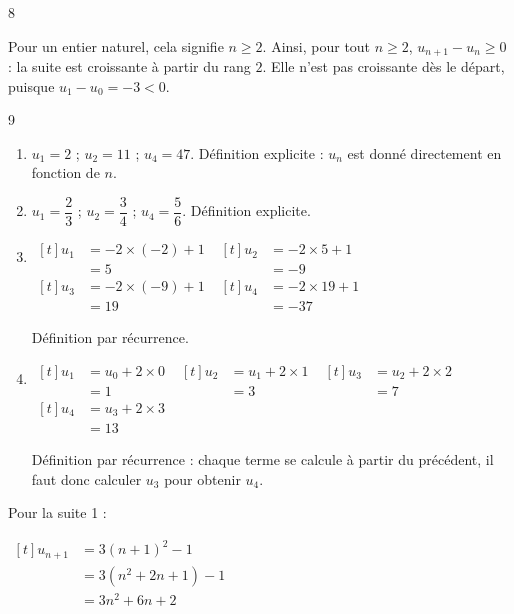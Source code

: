 \documentclass[10pt,a4paper]{article}
\begin{document}
\begin{corr}[Guidé]{8}
\begin{enumerate}[leftmargin=*]
    Pour un entier naturel, cela signifie \(n\geq 2\). Ainsi, pour tout \(n\geq 2\), \(u_{n+1}-u_n\geq 0\) : la suite est croissante à partir du rang \(2\). Elle n'est pas croissante dès le départ, puisque \(u_1-u_0=-3<0\).
\end{enumerate}
\end{corr}

\begin{corr}{9}
\begin{enumerate}[leftmargin=*]
    \item \(u_1=2\) ; \(u_2=11\) ; \(u_4=47\). Définition explicite : \(u_n\) est donné directement en fonction de \(n\).
    \item \(u_1=\dfrac{2}{3}\) ; \(u_2=\dfrac{3}{4}\) ; \(u_4=\dfrac{5}{6}\). Définition explicite.
    \item \(\begin{aligned}[t] u_1&=-2\times(-2)+1\\ &=5\end{aligned}\) \qquad \(\begin{aligned}[t] u_2&=-2\times 5+1\\ &=-9\end{aligned}\) \qquad \(\begin{aligned}[t] u_3&=-2\times(-9)+1\\ &=19\end{aligned}\) \qquad \(\begin{aligned}[t] u_4&=-2\times 19+1\\ &=-37\end{aligned}\)

    Définition par récurrence.
    \item[\(\star\)~4.] \(\begin{aligned}[t] u_1&=u_0+2\times 0\\ &=1\end{aligned}\) \qquad \(\begin{aligned}[t] u_2&=u_1+2\times 1\\ &=3\end{aligned}\) \qquad \(\begin{aligned}[t] u_3&=u_2+2\times 2\\ &=7\end{aligned}\) \qquad \(\begin{aligned}[t] u_4&=u_3+2\times 3\\ &=13\end{aligned}\)

    Définition par récurrence : chaque terme se calcule à partir du précédent, il faut donc calculer \(u_3\) pour obtenir \(u_4\).
\end{enumerate}
Pour la suite 1 :

\(\begin{aligned}[t] u_{n+1}&=3(n+1)^2-1\\ &=3(n^2+2n+1)-1\\ &=3n^2+6n+2\end{aligned}\)
\end{corr}
\end{document}
